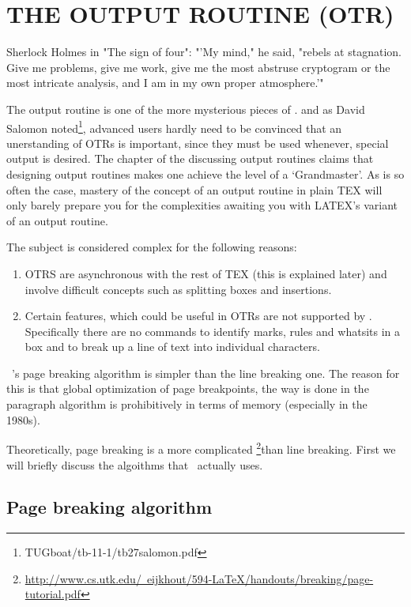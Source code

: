 \chapter{THE OUTPUT ROUTINE (OTR)}
\epigraph{Sherlock Holmes in "The sign of four": "'My mind," he said, "rebels at stagnation. Give me problems, give me work, give me the most abstruse cryptogram or the most intricate analysis, and I am in my own proper atmosphere.'" }{}
\normalsize
The output routine is one of the more mysterious pieces
of \tex.
and as  David Salomon noted\footnote{TUGboat/tb-11-1/tb27salomon.pdf}, advanced users hardly need to be convinced that an unerstanding of OTRs is important, since they must be used whenever, special output is desired.
 The chapter of the \texbook discussing output
routines claims that designing output routines makes one
achieve the level of a `\tex Grandmaster'.
As is so often the case, mastery of the concept of an
output routine in plain TEX will only barely prepare you
for the complexities awaiting you with LATEX’s variant of
an output routine.

The subject is considered complex for the following reasons:

\begin{enumerate}
\item OTRS are asynchronous with the
rest of TEX (this is explained later) and involve difficult concepts such as splitting boxes and insertions.
\item Certain features, which could be useful in OTRs are not supported by \tex. Specifically there are no commands to identify marks, rules and whatsits in a box and to break up a line of text into individual characters.
\end{enumerate}

\tex\ 's page breaking algorithm is simpler than the line breaking one. The reason for this is that global optimization
of page breakpoints, the way is done in the paragraph algorithm is prohibitively in terms of memory (especially in the 1980s).

Theoretically, page breaking is a more complicated \footnote{\href{test}{http://www.cs.utk.edu/~eijkhout/594-LaTeX/handouts/breaking/page-tutorial.pdf}}than line breaking. First we will briefly discuss the algoithms that \tex\ actually
uses.


\section{Page breaking algorithm}

